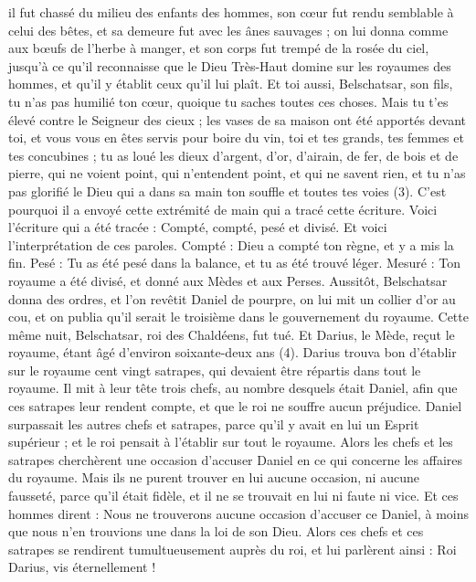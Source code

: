 \begin{multicols}{2}
il fut chassé du milieu des enfants des hommes, son cœur  fut rendu semblable à celui des bêtes, et sa demeure fut avec les ânes sauvages ; on lui donna comme aux bœufs de l'herbe à manger, et son corps fut trempé de la rosée du ciel, jusqu'à ce qu'il reconnaisse que le Dieu Très-Haut domine sur les royaumes des hommes, et qu'il y établit ceux qu'il lui plaît.
Et toi aussi, Belschatsar, son fils, tu n'as pas humilié ton cœur, quoique tu saches toutes ces choses.
Mais tu t'es élevé contre le Seigneur des cieux ; les vases de sa maison ont été apportés devant toi, et vous vous en êtes servis pour boire du vin, toi et tes grands, tes femmes et tes concubines ; tu as loué les dieux d'argent, d'or, d'airain, de fer, de bois et de pierre, qui ne voient point, qui n'entendent point, et qui ne savent rien, et tu n'as pas glorifié le Dieu qui a dans  sa main ton souffle et toutes tes voies (3).
C’est pourquoi il a envoyé cette extrémité de main qui a tracé cette écriture.
Voici l'écriture qui a été tracée : Compté, compté, pesé et divisé.
Et voici l'interprétation de ces paroles. Compté : Dieu a compté ton règne, et y a mis la fin.
Pesé : Tu as été pesé dans la balance, et tu as été trouvé léger.
Mesuré : Ton royaume a été divisé, et donné aux Mèdes et aux Perses.
Aussitôt, Belschatsar donna des ordres, et l’on revêtit Daniel de pourpre, on lui mit un collier d'or au cou, et on publia qu'il serait le troisième dans le gouvernement du royaume.
Cette même nuit, Belschatsar, roi des Chaldéens, fut tué.
Et Darius, le Mède, reçut le royaume, étant âgé d'environ soixante-deux ans (4).
\VerseOne{}Darius trouva bon d'établir sur le royaume cent vingt satrapes, qui devaient être répartis dans tout le royaume.
Il mit à leur tête trois chefs, au nombre desquels était Daniel, afin que ces satrapes leur rendent compte, et que le roi ne souffre aucun préjudice.
Daniel surpassait les autres chefs et satrapes, parce qu'il y avait en lui un Esprit supérieur ; et le roi pensait à l'établir sur tout le royaume.
Alors les chefs et les satrapes cherchèrent une occasion d'accuser Daniel en ce qui concerne les affaires du royaume.  Mais ils ne purent trouver en lui aucune occasion,  ni aucune fausseté, parce qu'il était fidèle, et il ne se trouvait en lui ni faute ni vice.
Et ces hommes dirent : Nous ne trouverons aucune occasion d'accuser ce Daniel, à moins que nous n’en trouvions une dans la loi de son Dieu.
Alors ces chefs et ces satrapes se rendirent tumultueusement auprès du roi, et lui parlèrent ainsi : Roi Darius, vis éternellement !

\end{multicols}
